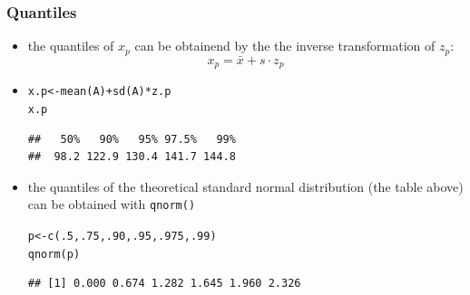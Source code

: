 \documentclass[extsize,handout,10pt]{beamer}\usepackage[]{graphicx}\usepackage[]{color}
\makeatletter
\newcommand{\hlnum}[1]{\textcolor[rgb]{0.502,0.086,1}{#1}}%
\newcommand{\hlopt}[1]{\textcolor[rgb]{0.251,0.251,0.251}{#1}}%
\newcommand{\hlstd}[1]{\textcolor[rgb]{0.251,0.251,0.251}{#1}}%
\newcommand{\hlkwb}[1]{\textcolor[rgb]{0,0.439,0.902}{#1}}%
\newcommand{\hlkwd}[1]{\textcolor[rgb]{0.69,0.188,0.941}{#1}}%
\newenvironment{kframe}{%
 \def\at@end@of@kframe{}%
 \ifinner\ifhmode%
  \def\at@end@of@kframe{\end{minipage}}%
  \begin{minipage}{\columnwidth}%
 \fi\fi%
 \def\FrameCommand##1{\hskip\@totalleftmargin \hskip-\fboxsep
 \colorbox{shadecolor}{##1}\hskip-\fboxsep
     \hskip-\linewidth \hskip-\@totalleftmargin \hskip\columnwidth}%
 \MakeFramed {\advance\hsize-\width
   \@totalleftmargin\z@ \linewidth\hsize
   \@setminipage}}%
 {\par\unskip\endMakeFramed%
 \at@end@of@kframe}
\newenvironment{knitrout}{}{} %
\makeatother
\begin{document}
  
  \begin{frame}[containsverbatim]
    \frametitle{Quantiles}
    \begin{itemize}
    \item<2-> the quantiles of $x_p$ can be obtainend by the the
      inverse transformation of $z_p$:
      \begin{equation*}
        \label{eq:invtransz}
        x_p=\bar{x}+s\cdot{z_p}
      \end{equation*}
    \item 
\scriptsize
\begin{knitrout}\tiny
{}\color{fgcolor}\begin{kframe}
\begin{alltt}
\hlstd{x.p} \hlkwb{<-} \hlkwd{mean}\hlstd{(A)}\hlopt{+}\hlkwd{sd}\hlstd{(A)}\hlopt{*}\hlstd{z.p}
\hlstd{x.p}
\end{alltt}
\begin{verbatim}
##   50%   90%   95% 97.5%   99% 
##  98.2 122.9 130.4 141.7 144.8
\end{verbatim}
\end{kframe}
\end{knitrout}
      
    \item the quantiles of the theoretical standard normal
      distribution (the table above) can be obtained with \texttt{qnorm()}

\begin{knitrout}\tiny
{}\color{fgcolor}\begin{kframe}
\begin{alltt}
\hlstd{p} \hlkwb{<-}\hlkwd{c}\hlstd{(}\hlnum{.5}\hlstd{,}\hlnum{.75}\hlstd{,}\hlnum{.90}\hlstd{,}\hlnum{.95}\hlstd{,}\hlnum{.975}\hlstd{,}\hlnum{.99}\hlstd{)}
\hlkwd{qnorm}\hlstd{(p)}
\end{alltt}
\begin{verbatim}
## [1] 0.000 0.674 1.282 1.645 1.960 2.326
\end{verbatim}
\end{kframe}
\end{knitrout}
    

\end{itemize}
  \end{frame}
\end{document}
